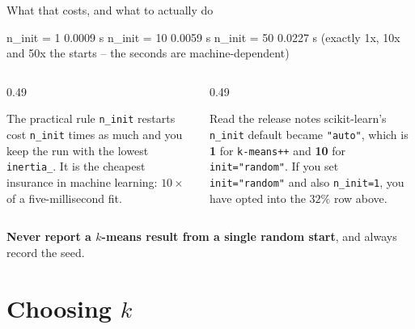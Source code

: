 \documentclass[aspectratio=169]{beamer}
\begin{document}
\begin{frame}[fragile,shrink=6]{What that costs, and what to actually do}
\begin{outblk}
  n_init =  1  0.0009 s   n_init = 10  0.0059 s   n_init = 50  0.0227 s
  (exactly 1x, 10x and 50x the starts -- the seconds are machine-dependent)
\end{outblk}
  \vspace{0.3em}
  \begin{columns}[T]
    \begin{column}{0.49\textwidth}
      \begin{exampleblock}{The practical rule}
        \small \texttt{n\_init} restarts cost \texttt{n\_init} times as much
        and you keep the run with the lowest \texttt{inertia\_}. It is the
        cheapest insurance in machine learning: $10\times$ of a
        five-millisecond fit.
      \end{exampleblock}
    \end{column}
    \begin{column}{0.49\textwidth}
      \begin{alertblock}{Read the release notes}
        \small scikit-learn's \texttt{n\_init} default became
        \texttt{"auto"}, which is \textbf{1} for \texttt{k-means++} and
        \textbf{10} for \texttt{init="random"}. If you set
        \texttt{init="random"} and also \texttt{n\_init=1}, you have opted
        into the $32\%$ row above.
      \end{alertblock}
    \end{column}
  \end{columns}
  \vspace{0.2em}
  \begin{center}\small
    \textbf{Never report a $k$-means result from a single random start},
    and always record the seed.
  \end{center}
\end{frame}

\section[Choosing $k$]{Choosing $k$}
\label{sec:k}
\end{document}
